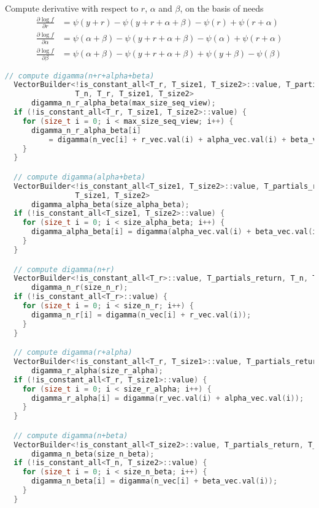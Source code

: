 \documentclass[11pt]{article}
\begin{document}
Compute derivative with respect to $r$, $\alpha$ and $\beta$, on the basis of needs
\begin{align}
\frac{\partial \log f}{\partial r} &= \psi(y+r) - \psi(y+r+\alpha+\beta) - \psi(r) + \psi(r+\alpha) \\
\frac{\partial \log f}{\partial \alpha} &= \psi(\alpha+\beta) - \psi(y+r+\alpha+\beta) - \psi(\alpha) + \psi(r+\alpha) \\
\frac{\partial \log f}{\partial \beta} &= \psi(\alpha+\beta) - \psi(y+r+\alpha+\beta) + \psi(y+\beta) - \psi(\beta)
\end{align}
\begin{lstlisting}[language=c++, style=lgeneral]
  // compute digamma(n+r+alpha+beta)
  VectorBuilder<!is_constant_all<T_r, T_size1, T_size2>::value, T_partials_return,
                T_n, T_r, T_size1, T_size2>
      digamma_n_r_alpha_beta(max_size_seq_view);
  if (!is_constant_all<T_r, T_size1, T_size2>::value) {
    for (size_t i = 0; i < max_size_seq_view; i++) {
      digamma_n_r_alpha_beta[i]
          = digamma(n_vec[i] + r_vec.val(i) + alpha_vec.val(i) + beta_vec.val(i));
    }
  }

  // compute digamma(alpha+beta)
  VectorBuilder<!is_constant_all<T_size1, T_size2>::value, T_partials_return,
                T_size1, T_size2>
      digamma_alpha_beta(size_alpha_beta);
  if (!is_constant_all<T_size1, T_size2>::value) {
    for (size_t i = 0; i < size_alpha_beta; i++) {
      digamma_alpha_beta[i] = digamma(alpha_vec.val(i) + beta_vec.val(i));
    }
  }

  // compute digamma(n+r)
  VectorBuilder<!is_constant_all<T_r>::value, T_partials_return, T_n, T_r>
      digamma_n_r(size_n_r);
  if (!is_constant_all<T_r>::value) {
    for (size_t i = 0; i < size_n_r; i++) {
      digamma_n_r[i] = digamma(n_vec[i] + r_vec.val(i));
    }
  }

  // compute digamma(r+alpha)
  VectorBuilder<!is_constant_all<T_r, T_size1>::value, T_partials_return, T_r, T_size1>
      digamma_r_alpha(size_r_alpha);
  if (!is_constant_all<T_r, T_size1>::value) {
    for (size_t i = 0; i < size_r_alpha; i++) {
      digamma_r_alpha[i] = digamma(r_vec.val(i) + alpha_vec.val(i));
    }
  }

  // compute digamma(n+beta)
  VectorBuilder<!is_constant_all<T_size2>::value, T_partials_return, T_n, T_size2>
      digamma_n_beta(size_n_beta);
  if (!is_constant_all<T_n, T_size2>::value) {
    for (size_t i = 0; i < size_n_beta; i++) {
      digamma_n_beta[i] = digamma(n_vec[i] + beta_vec.val(i));
    }
  }


\end{lstlisting}
\end{document}
